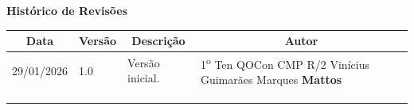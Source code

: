 \begin{table}[h]
	\begin{center}
	    \textbf{\Huge{Histórico de Revisões}}
	\end{center}
    \centering
	\begin{tabular}{|p{3cm}|p{1.5cm}|p{7.5cm}|p{3.2cm}|}
		\hline \multicolumn{1}{|c|}{\textbf{Data}} & \multicolumn{1}{|c|}{\textbf{Versão}} &
			\multicolumn{1}{|c|}{\textbf{Descrição}} & \multicolumn{1}{|c|}{\textbf{Autor}} \\ \hline
		{29/01/2026} & 1.0 & Versão inicial. & 1\textsuperscript{o} Ten QOCon CMP R/2 Vinícius Guimarães Marques \textbf{Mattos} \\ \hline
		& & & \\ \hline
		& & & \\ \hline
		& & & \\ \hline
	\end{tabular}
\end{table}

